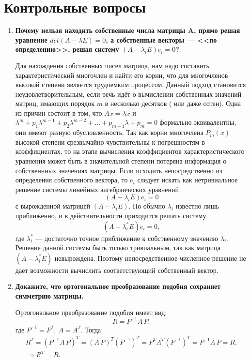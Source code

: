 \documentclass[12pt, a4paper]{article}
\begin{document}
    \section{Контрольные вопросы}
    \begin{enumerate}
    \item {\bf Почему нельзя находить собственные числа матрицы A, прямо решая уравнение $det(A - \lambda E) = 0$, а собственные векторы --- <<по определению>>, решая систему $(A - \lambda_i E)e_i = 0$? }
    
    Для нахождения собственных чисел матрица, нам надо составить характеристический многочлен и найти его корни, что для многочленов высокой степени является трудоемким процессом. Данный подход становится неудовлетворительным, если речь идёт о вычислении собственных значений матриц, имающих порядок $m$ в несколько десятков ( или даже сотен). Одна из причин состоит в том, что $Ax=\lambda x$ и $\lambda^{m}+p_{1}\lambda^{m-1}+p_{2}\lambda^{m-2}+\ldots+p_{m-1}\lambda + p_{m}=0$ формально эквивалентны, они имеют разную обусловленность. Так как корни многочлена $P_{m}(x)$ высокой степени срезвычайно чувствительны к погрешностям в коэффициентах, то на этапе вычисления коэффициентов характеристического уравнения может быть в значительной степени потеряна информация о собственнных значениях матрицы. Если исходить непосредственно из определения собственного вектора, то $ e_{i} $ следует искать как нетривиальное решение системы линейных алгебраических уравнений 
	\[ (A - \lambda_{i} E) e_{i} = 0 \]
	с вырожденной матрицей $ (A - \lambda_{i} E) $. Но обычно $ \lambda_{i} $ известно лишь приближенно, и в действительности приходится решать систему 
	\[ (A - \lambda_{i}^{\ast} E) e_{i} = 0, \]
	где $ \lambda_{i}^{\ast} $ --- достаточно точное приближение к собственному значению $ \lambda_{i} $. Решение данной системы быть только тривиальным, так как матрица $ (A - \lambda_{i}^{\ast} E) $ невырождена. Поэтому непосредственное численное решение не дает возможности вычислить соответствующий собственный вектор.
    
    \newpage

    \item {\bf Докажите, что ортогональное преобразование подобия сохраняет симметрию матрицы. }
    
    Ортогональное преобразование подобия имеет вид:
	\[ R = P^{-1} A \, P, \]
	где $ P^{-1} = P^{T}, \: A = A^{T} $. Тогда 
	\begin{gather*}
		R^{T} = \left( P^{-1} A \, P \right)^{T} = \left( A \, P \right)^{T}\left(P^{-1}\right)^{T}  = P^{T} A^{T} \left( P^{-1} \right)^{T} = P^{-1} A \, P = R, \\
		\Longrightarrow R^{T} = R.
	\end{gather*}



\end{enumerate}
\end{document}
